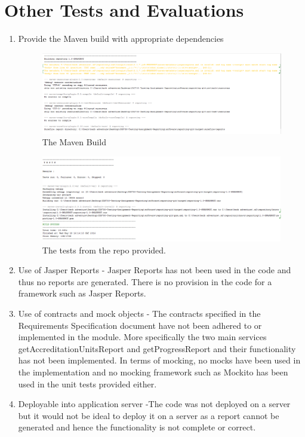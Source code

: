 \section{Other Tests and Evaluations}
 
\begin{enumerate}    
\item Provide the Maven build with appropriate dependencies
\begin{figure}[h!]
	\includegraphics[scale=0.6]{./figures/mavenBuild1.PNG}
	\caption{The Maven Build}
\end{figure} 

\begin{figure}[h!]
	\includegraphics[scale=0.6]{./figures/mavenBuild2.PNG}
	\caption{The tests from the repo provided.}
\end{figure}
\item Use of Jasper Reports - Jasper Reports has not been used in the code and thus no reports are generated. There is no provision in the code for a framework such as Jasper Reports. 
\item Use of contracts and mock objects - The contracts specified in the Requirements Specification document have not been adhered to or implemented in the module. More specifically the two main services getAccreditationUnitsReport and getProgressReport and their functionality has not been implemented. In terms of mocking, no mocks have been used in the implementation and no mocking framework such as Mockito has been used in the unit tests provided either.
\item Deployable into application server -The code was not deployed on a server but it would not be ideal to deploy it on a server as a report cannot be generated and hence the functionality is not complete or correct.  
\end{enumerate}

